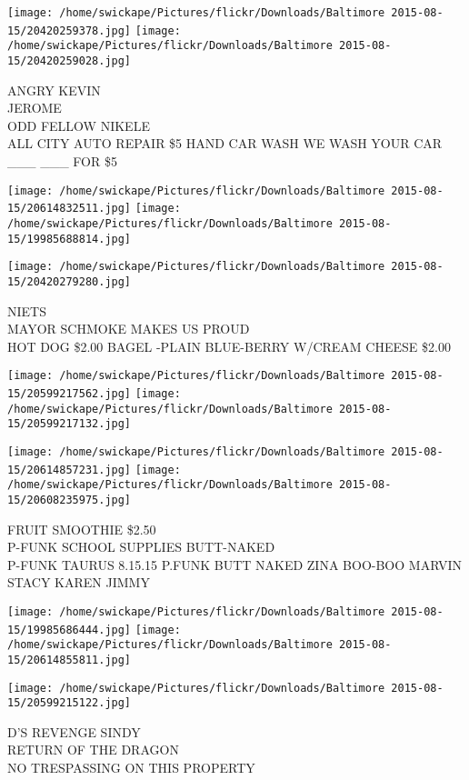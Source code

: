 \documentclass[10pt,letterpaper]{article}
\begin{document}
\texttt{[image: /home/swickape/Pictures/flickr/Downloads/Baltimore 2015-08-15/20420259378.jpg]}
\texttt{[image: /home/swickape/Pictures/flickr/Downloads/Baltimore 2015-08-15/20420259028.jpg]}

ANGRY KEVIN\\
JEROME\\
ODD FELLOW NIKELE\\
ALL CITY AUTO REPAIR \$5 HAND CAR WASH WE WASH YOUR CAR \_\_\_ \_\_\_ FOR \$5
\pagebreak

\texttt{[image: /home/swickape/Pictures/flickr/Downloads/Baltimore 2015-08-15/20614832511.jpg]}
\texttt{[image: /home/swickape/Pictures/flickr/Downloads/Baltimore 2015-08-15/19985688814.jpg]}

\vspace{0.25in}
\texttt{[image: /home/swickape/Pictures/flickr/Downloads/Baltimore 2015-08-15/20420279280.jpg]}

NIETS\\
MAYOR SCHMOKE MAKES US PROUD\\
HOT DOG \$2.00 BAGEL {-}PLAIN BLUE{-}BERRY W/CREAM CHEESE \$2.00
\pagebreak

\texttt{[image: /home/swickape/Pictures/flickr/Downloads/Baltimore 2015-08-15/20599217562.jpg]}
\texttt{[image: /home/swickape/Pictures/flickr/Downloads/Baltimore 2015-08-15/20599217132.jpg]}

\texttt{[image: /home/swickape/Pictures/flickr/Downloads/Baltimore 2015-08-15/20614857231.jpg]}
\texttt{[image: /home/swickape/Pictures/flickr/Downloads/Baltimore 2015-08-15/20608235975.jpg]}

FRUIT SMOOTHIE \$2.50\\
P{-}FUNK SCHOOL SUPPLIES BUTT{-}NAKED\\
P{-}FUNK TAURUS 8.15.15 P.FUNK BUTT NAKED ZINA BOO{-}BOO MARVIN\\
STACY KAREN JIMMY
\pagebreak

\texttt{[image: /home/swickape/Pictures/flickr/Downloads/Baltimore 2015-08-15/19985686444.jpg]}
\texttt{[image: /home/swickape/Pictures/flickr/Downloads/Baltimore 2015-08-15/20614855811.jpg]}

\vspace{0.25in}
\texttt{[image: /home/swickape/Pictures/flickr/Downloads/Baltimore 2015-08-15/20599215122.jpg]}

D'S REVENGE SINDY\\
RETURN OF THE DRAGON\\
NO TRESPASSING ON THIS PROPERTY
\pagebreak
\end{document}
